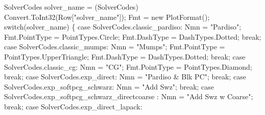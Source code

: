 { \newline 
\btab \btab    SolverCodes solver\_name = (SolverCodes) Convert.ToInt32(Row["solver\_name"]);\newline 
\btab \btab    Fmt                     = new PlotFormat();\newline 
\btab \btab    switch(solver\_name) \{\newline 
\btab \btab    case SolverCodes.classic\_pardiso: \newline 
\btab \btab \btab    Nmn           = "Pardiso"; \newline 
\btab \btab \btab    Fmt.PointType = PointTypes.Circle;\newline 
\btab \btab \btab    Fmt.DashType  = DashTypes.Dotted;\newline 
\btab \btab \btab    break;\newline 
\btab \btab    case SolverCodes.classic\_mumps: \newline 
\btab \btab \btab    Nmn           = "Mumps"; \newline 
\btab \btab \btab    Fmt.PointType = PointTypes.UpperTriangle;\newline 
\btab \btab \btab    Fmt.DashType  = DashTypes.Dotted;\newline 
\btab \btab \btab    break;\newline 
\btab \btab    case SolverCodes.classic\_cg: \newline 
\btab \btab \btab    Nmn           = "CG"; \newline 
\btab \btab \btab    Fmt.PointType = PointTypes.Diamond;\newline 
\btab \btab \btab    break;\newline 
\btab \btab    case SolverCodes.exp\_direct: \newline 
\btab \btab \btab    Nmn = "Pardiso & Blk PC"; \newline 
\btab \btab \btab    break;\newline 
\btab \btab    case SolverCodes.exp\_softpcg\_schwarz: \newline 
\btab \btab \btab    Nmn = "Add Swz"; \newline 
\btab \btab \btab    break;\newline 
\btab \btab    case SolverCodes.exp\_softpcg\_schwarz\_directcoarse : \newline 
\btab \btab \btab    Nmn = "Add Swz w Coarse"; \newline 
\btab \btab \btab    break;\newline 
\btab \btab    case SolverCodes.exp\_direct\_lapack: \newline 
}
